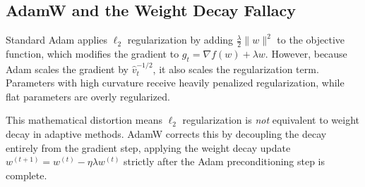 \subsection{AdamW and the Weight Decay Fallacy}
Standard Adam applies $\ell_2$ regularization by adding $\frac{\lambda}{2}\|w\|^2$ to the objective function, which modifies the gradient to $g_t = \nabla f(w) + \lambda w$. However, because Adam scales the gradient by $\hat{v}_t^{-1/2}$, it also scales the regularization term. Parameters with high curvature receive heavily penalized regularization, while flat parameters are overly regularized. 

This mathematical distortion means $\ell_2$ regularization is \textit{not} equivalent to weight decay in adaptive methods. AdamW \cite{loshchilov2017decoupled} corrects this by decoupling the decay entirely from the gradient step, applying the weight decay update $w^{(t+1)} = w^{(t)} - \eta \lambda w^{(t)}$ strictly after the Adam preconditioning step is complete.
